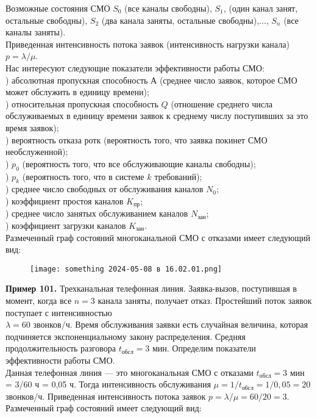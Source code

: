 \documentclass{article}
\begin{document}
Возможные  состояния СМО $S_0$ (все каналы свободны), $S_1$,  (один канал занят, остальные свободны), $S_2$ (два канала заняты, остальные свободны),..., $S_n$ (все каналы заняты). \\ \indent
Приведенная  интенсивность  потока  заявок  (интенсивность  нагрузки канала) $p = \lambda/\mu$. \\ \indent 
Нас  интересуют  следующие  показатели  эффективности  работы СМО: \\ 
)     абсолютная пропускная способность $А$  (среднее число заявок, которое СМО может обслужить в единицу времени);
\\ ) относительная пропускная способность $Q$ (отношение среднего числа обслуживаемых в единицу времени заявок к среднему числу поступивших за это время заявок);
\\ )  вероятность отказа ротк  (вероятность того,  что заявка покинет СМО необслуженной);
\\ ) $p_0$ (вероятность того, что все обслуживающие каналы свободны);
\\ ) $p_k$ (вероятность того, что в системе $k$  требований);
\\ ) среднее число свободных от обслуживания каналов $N_0$;
\\ ) коэффициент простоя каналов $K_{\text{пр}}$;
\\ ) среднее число занятых обслуживанием каналов $N_{\text{зан}}$; 
\\ ) коэффициент загрузки каналов $K_{\text{зан}}$. 
\\ \indent 
Размеченный  граф  состояний  многоканальной  СМО  с  отказами имеет следующий вид:

\begin{figure}[h] 
\centering
\texttt{[image: something 2024-05-08 в 16.02.01.png]}
\label{fig:my_label}
\end{figure} 

\indent \; \; \; \textbf{Пример  101.} Трехканальная телефонная линия.  Заявка-вызов, поступившая в момент, когда все $n = 3$ канала заняты, получает отказ. Простейший поток заявок поступает с интенсивностью \\ $\lambda = 60 $ звонков/ч. Время обслуживания заявки есть случайная величина, которая подчиняется  экспоненциальному  закону  распределения.  Средняя продолжительность разговора \; $t_{\text{обсл}} = 3$  мин.  Определим  показатели эффективности работы СМО. \\ 
\indent 
Данная телефонная линия — это многоканальная СМО с отказами $t_{\text{обсл}} = 3$ мин = 3/60 ч = 0,05 ч. Тогда интенсивность обслуживания $\mu = 1/t_{\text{обсл}} = 1 / 0,05 = 20$ звонков/ч. Приведенная интенсивность потока заявок $p = \lambda/\mu= 60/20 = 3$.  Размеченный граф состояний имеет следующий вид:
\end{document}
